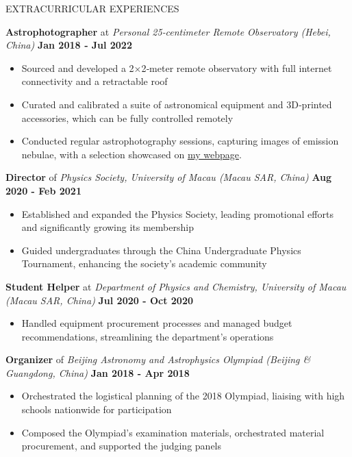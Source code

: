 \documentclass[10pt]{article} %
\begin{document}
\begin{section}{EXTRACURRICULAR EXPERIENCES}
    
\textbf{Astrophotographer} at \textit{Personal 25‑centimeter Remote Observatory (Hebei, China)} \hfill \textbf{Jan 2018 ‑ Jul 2022}
\begin{itemize}[leftmargin=1.5em]
    \item Sourced and developed a 2×2‑meter remote observatory with full internet connectivity and a retractable roof
    \item Curated and calibrated a suite of astronomical equipment and 3D‑printed accessories, which can be fully controlled remotely
    \item Conducted regular astrophotography sessions, capturing images of emission nebulae, with a selection showcased on \href{https://yliu.fit/astrophotography/}{my webpage}.
\end{itemize}

\textbf{Director} of \textit{Physics Society, University of Macau (Macau SAR, China)} \hfill \textbf{Aug 2020 - Feb 2021} 
\begin{itemize}[leftmargin=1.5em]
    \item Established and expanded the Physics Society, leading promotional efforts and significantly growing its membership
    \item Guided undergraduates through the China Undergraduate Physics Tournament, enhancing the society's academic community
\end{itemize}

\textbf{Student Helper} at \textit{Department of Physics and Chemistry, University of Macau (Macau SAR, China)} \hfill \textbf{Jul 2020 - Oct 2020} 
\begin{itemize}[leftmargin=1.5em]
    \item Handled equipment procurement processes and managed budget recommendations, streamlining the department's operations
\end{itemize}

\textbf{Organizer} of \textit{Beijing Astronomy and Astrophysics Olympiad (Beijing \& Guangdong, China)} \hfill \textbf{Jan 2018 - Apr 2018} 
\begin{itemize}[leftmargin=1.5em]
    \item Orchestrated the logistical planning of the 2018 Olympiad, liaising with high schools nationwide for participation
    \item Composed the Olympiad's examination materials, orchestrated material procurement, and supported the judging panels
\end{itemize}


\end{section}
\end{document}
